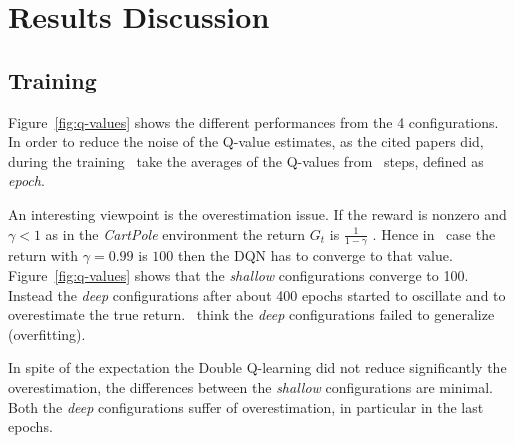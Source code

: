 \section{Results Discussion}

\subsection{Training}


Figure~\ref{fig:q-values} shows the different performances from the 4 configurations. In order to reduce the noise of the Q-value estimates, as the cited papers did, during the training \auth~take the averages of the Q-values from \numepoch~steps, defined as \textit{epoch}. %

An interesting viewpoint is the overestimation issue. If the reward is nonzero and $\gamma < 1$ as in the \textit{CartPole} environment the return $G_t$ is $\frac{1}{1 - \gamma}$ \cite{Sutton:1998:IRL:551283}. Hence in \authpp~case the return with $\gamma = 0.99$ is $100$ then the DQN has to converge to that value.
Figure~\ref{fig:q-values} shows that the \textit{shallow} configurations converge to 100. Instead the \textit{deep} configurations after about 400 epochs started to oscillate and to overestimate the true return. \Auth~think the \textit{deep} configurations failed to generalize (overfitting).

In spite of the expectation the Double Q-learning did not reduce significantly the overestimation, the differences between the \textit{shallow} configurations are minimal. Both the \textit{deep} configurations suffer of overestimation, in particular in the last epochs.

